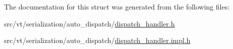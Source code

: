 The documentation for this struct was generated from the following files\+:\begin{DoxyCompactItemize}
\item 
src/vt/serialization/auto\+\_\+dispatch/\hyperlink{dispatch__handler_8h}{dispatch\+\_\+handler.\+h}\item 
src/vt/serialization/auto\+\_\+dispatch/\hyperlink{dispatch__handler_8impl_8h}{dispatch\+\_\+handler.\+impl.\+h}\end{DoxyCompactItemize}
